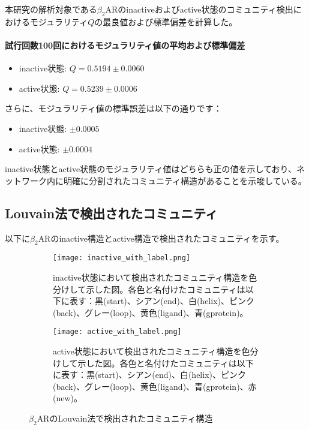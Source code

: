 本研究の解析対象である$\beta_2$ARのinactiveおよびactive状態のコミュニティ検出におけるモジュラリティ$Q$の最良値および標準偏差を計算した。

\paragraph{試行回数100回におけるモジュラリティ値の平均および標準偏差}
\begin{itemize}
    \item inactive状態: \( Q = 0.5194 \pm 0.0060 \)
    \item active状態: \( Q = 0.5239 \pm 0.0006 \)
\end{itemize}
さらに、モジュラリティ値の標準誤差は以下の通りです：
\begin{itemize}
    \item inactive状態: \( \pm 0.0005 \)
    \item active状態: \( \pm 0.0004 \)
\end{itemize}

inactive状態とactive状態のモジュラリティ値はどちらも正の値を示しており、ネットワーク内に明確に分割されたコミュニティ構造があることを示唆している。

\subsection{Louvain法で検出されたコミュニティ}

以下に$\beta_2$ARのinactive構造とactive構造で検出されたコミュニティを示す。

\begin{figure}[htbp]
    \centering
    \begin{subfigure}{0.60\textwidth} %
      \centering
      \texttt{[image: inactive\_with\_label.png]}
      \caption{inactive状態において検出されたコミュニティ構造を色分けして示した図。各色と名付けたコミュニティは以下に表す：黒(start)、シアン(end)、白(helix)、ピンク(back)、グレー(loop)、黄色(ligand)、青(gprotein)。}
      \label{fig:inactive_community}
    \end{subfigure}
    \hspace{0.02\textwidth} %
    \begin{subfigure}{0.60\textwidth}
      \centering
      \texttt{[image: active\_with\_label.png]}
      \caption{active状態において検出されたコミュニティ構造を色分けして示した図。各色と名付けたコミュニティは以下に表す：黒(start)、シアン(end)、白(helix)、ピンク(back)、グレー(loop)、黄色(ligand)、青(gprotein)、赤(new)。}
      \label{fig:active_community}
    \end{subfigure}
    \caption{$\beta_2$ARのLouvain法で検出されたコミュニティ構造}
    \label{fig:community-all}
  \end{figure}

